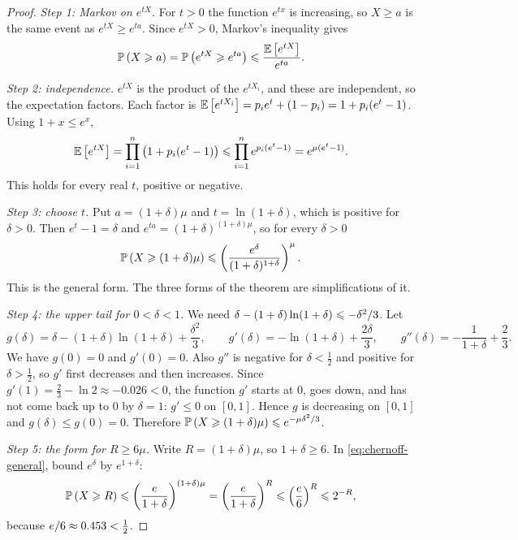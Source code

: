 \begin{proof}
    \emph{Step 1: Markov on $e^{tX}$.} For $t > 0$ the function $e^{tx}$ is increasing, so
    $X \geq a$ is the same event as $e^{tX} \geq e^{ta}$. Since $e^{tX} > 0$, Markov's inequality
    gives
    \[\operatorname{\mathbb{P}}\left(X \geqslant a\right) = \operatorname{\mathbb{P}}\left(e^{tX} \geqslant e^{ta}\right) \leqslant \frac{\operatorname{\mathbb{E}}\left[e^{tX}\right]}{e^{ta}}.\]

    \emph{Step 2: independence.} $e^{tX}$ is the product of the $e^{tX_i}$, and these are
    independent, so the expectation factors. Each factor is
    $\operatorname{\mathbb{E}}\left[e^{tX_i}\right] = p_i e^t + (1 - p_i) = 1 + p_i(e^t - 1)$. Using $1 + x \leq e^x$,
    \[\operatorname{\mathbb{E}}\left[e^{tX}\right] = \prod_{i=1}^{n} \left(1 + p_i(e^t - 1)\right)
        \leqslant \prod_{i=1}^{n} e^{p_i(e^t - 1)} = e^{\mu(e^t - 1)}.\]
    This holds for every real $t$, positive or negative.

    \emph{Step 3: choose $t$.} Put $a = (1+\delta)\mu$ and $t = \ln(1+\delta)$, which is positive
    for $\delta > 0$. Then $e^t - 1 = \delta$ and $e^{ta} = (1+\delta)^{(1+\delta)\mu}$, so for every
    $\delta > 0$
    \begin{equation}\label{eq:chernoff-general}
        \operatorname{\mathbb{P}}\left(X \geqslant (1+\delta)\mu\right) \leqslant \left(\frac{e^{\delta}}{(1+\delta)^{1+\delta}}\right)^{\mu}.
    \end{equation}
    This is the general form. The three forms of the theorem are simplifications of it.

    \emph{Step 4: the upper tail for $0 < \delta < 1$.} We need
    $\delta - (1+\delta)\ln(1+\delta) \leqslant -\delta^2/3$. Let
    \[g(\delta) = \delta - (1+\delta)\ln(1+\delta) + \frac{\delta^2}{3},
        \qquad
        g'(\delta) = -\ln(1+\delta) + \frac{2\delta}{3},
        \qquad
        g''(\delta) = -\frac{1}{1+\delta} + \frac{2}{3}.\]
    We have $g(0) = 0$ and $g'(0) = 0$. Also $g''$ is negative for $\delta < \frac{1}{2}$ and
    positive for $\delta > \frac{1}{2}$, so $g'$ first decreases and then increases. Since
    $g'(1) = \frac{2}{3} - \ln 2 \approx -0.026 < 0$, the function $g'$ starts at $0$, goes down, and
    has not come back up to $0$ by $\delta = 1$: $g' \leq 0$ on $[0, 1]$. Hence $g$ is decreasing
    on $[0, 1]$ and $g(\delta) \leq g(0) = 0$. Therefore
    $\operatorname{\mathbb{P}}\left(X \geqslant (1+\delta)\mu\right) \leqslant e^{-\mu\delta^2/3}$.

    \emph{Step 5: the form for $R \geq 6\mu$.} Write $R = (1+\delta)\mu$, so $1 + \delta \geq 6$.
    In \cref{eq:chernoff-general}, bound $e^{\delta}$ by $e^{1+\delta}$:
    \[\operatorname{\mathbb{P}}\left(X \geqslant R\right) \leqslant \left(\frac{e}{1+\delta}\right)^{(1+\delta)\mu}
        = \left(\frac{e}{1+\delta}\right)^{R} \leqslant \left(\frac{e}{6}\right)^{R} \leqslant 2^{-R},\]
    because $e/6 \approx 0.453 < \frac{1}{2}$.


\end{proof}
